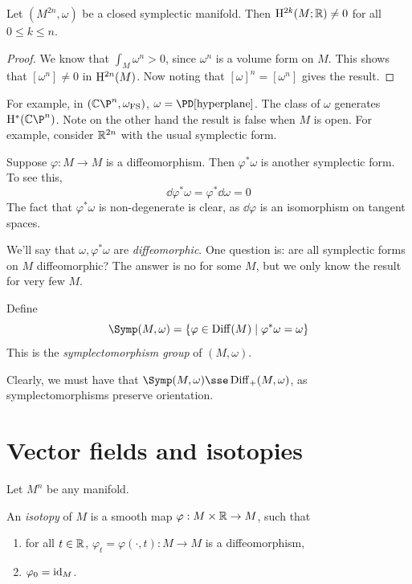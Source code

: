 \documentclass{article}
\begin{document}
\begin{corollary}
    Let \((M^{2n}, \omega)\) be a closed symplectic manifold. Then \(\mathrm{H}^{2k}(M; \mathbb{R}) \ne 0\) for all \(0 \le k \le n\).
\end{corollary}

\begin{proof}
    We know that \(\int_M\omega^n > 0\), since \(\omega^n\) is a volume form on \(M\). This shows that \([\omega^n] \ne 0\) in \(\mathrm{H}^{2n}(M)\). Now noting that \([\omega]^n = [\omega^n]\) gives the result.
\end{proof}

For example, in \((\C\P^n, \omega_\text{FS})\), \(\omega = \PD[\text{hyperplane}]\). The class of \(\omega\) generates \(\HH^*(\C\P^n)\). Note on the other hand the result is false when \(M\) is open. For example, consider \(\mathbb{R}^{2n}\) with the usual symplectic form.

Suppose \(\varphi : M \to M\) is a diffeomorphism. Then \(\varphi^*\omega\) is another symplectic form. To see this,
\[\dd\varphi^*\omega = \varphi^*\dd\omega = 0\]
The fact that \(\varphi^*\omega\) is non-degenerate is clear, as \(\dd\varphi\) is an isomorphism on tangent spaces.

We'll say that \(\omega, \varphi^*\omega\) are \emph{diffeomorphic}. One question is: are all symplectic forms on \(M\) diffeomorphic? The answer is no for some \(M\), but we only know the result for very few \(M\).

\begin{definition}
    Define
    \[\Symp(M, \omega) = \{\varphi \in \Diff(M) \mid \varphi^*\omega = \omega\}\]
    This is the \emph{symplectomorphism group} of \((M, \omega)\).
\end{definition}

Clearly, we must have that \(\Symp(M, \omega) \sse \Diff_+(M, \omega)\), as symplectomorphisms preserve orientation.

\section{Vector fields and isotopies}

Let \(M^n\) be any manifold.

\begin{definition}
    An \emph{isotopy} of \(M\) is a smooth map \(\varphi : M \times \mathbb{R} \to M\), such that
    \begin{enumerate}
        \item for all \(t \in \mathbb{R}\), \(\varphi_t = \varphi(\cdot, t) : M \to M\) is a diffeomorphism,
        \item \(\varphi_0 = \operatorname{id}_M\).
    \end{enumerate}
\end{definition}
\end{document}
